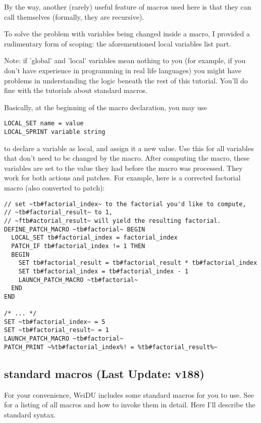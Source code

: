 \documentclass{article}
\def\ttref#1{\ahrefloc{#1}{\tt #1}}
\begin{document}
By the way, another (rarely) useful feature of macros used here is that they
can call themselves (formally, they are recursive).

To solve the problem with variables being changed inside a macro, I provided
a rudimentary form of scoping: the aforementioned local variables list part.

Note: if 'global' and 'local' variables mean nothing to you (for example, if you
don't have experience in programming in real life languages) you might have
problems in understanding the logic beneath the rest of this tutorial. You'll do
fine with the tutorials about standard macros.

Basically, at the beginning of the macro declaration, you may use
\begin{verbatim}
LOCAL_SET name = value
LOCAL_SPRINT variable string
\end{verbatim}
to declare a variable as local, and assign it a new value. Use this for all variables
that don't need to be changed by the macro. After computing the macro, these variables
are set to the value they had before the macro was processed. They work for both
actions and patches. For example, here is a corrected
factorial macro (also converted to patch):
\begin{verbatim}
// set ~tb#factorial_index~ to the factorial you'd like to compute,
// ~tb#factorial_result~ to 1,
// ~ftb#actorial_result~ will yield the resulting factorial.
DEFINE_PATCH_MACRO ~tb#factorial~ BEGIN
  LOCAL_SET tb#factorial_index = factorial_index
  PATCH_IF tb#factorial_index != 1 THEN
  BEGIN
    SET tb#factorial_result = tb#factorial_result * tb#factorial_index
    SET tb#factorial_index = tb#factorial_index - 1
    LAUNCH_PATCH_MACRO ~tb#factorial~
  END
END

/* ... */
SET ~tb#factorial_index~ = 5
SET ~tb#factorial_result~ = 1
LAUNCH_PATCH_MACRO ~tb#factorial~
PATCH_PRINT ~%tb#factorial_index%! = %tb#factorial_result%~
\end{verbatim}

\subsection{standard macros (Last Update: v188)}

For your convenience, WeiDU includes some standard macros for you to use.
See \ttref{Macros Listing} for a listing of all macros and how to invoke
them in detail. Here I'll describe the standard syntax.
\end{document}
